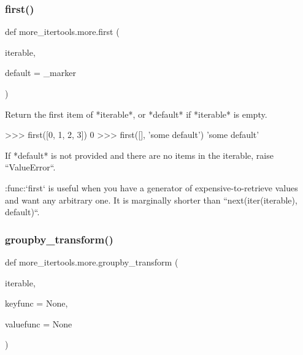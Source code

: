 \subsubsection{\texorpdfstring{first()}{first()}}
{\footnotesize\ttfamily def more\+\_\+itertools.\+more.\+first (\begin{DoxyParamCaption}\item[{}]{iterable,  }\item[{}]{default = {\ttfamily \+\_\+marker} }\end{DoxyParamCaption})}

\begin{DoxyVerb}Return the first item of *iterable*, or *default* if *iterable* is
empty.

    >>> first([0, 1, 2, 3])
    0
    >>> first([], 'some default')
    'some default'

If *default* is not provided and there are no items in the iterable,
raise ``ValueError``.

:func:`first` is useful when you have a generator of expensive-to-retrieve
values and want any arbitrary one. It is marginally shorter than
``next(iter(iterable), default)``.\end{DoxyVerb}
 \mbox{\label{namespacemore__itertools_1_1more_a78d2df36687e0e1116b8cdac592be650}} 
\subsubsection{\texorpdfstring{groupby\+\_\+transform()}{groupby\_transform()}}
{\footnotesize\ttfamily def more\+\_\+itertools.\+more.\+groupby\+\_\+transform (\begin{DoxyParamCaption}\item[{}]{iterable,  }\item[{}]{keyfunc = {\ttfamily None},  }\item[{}]{valuefunc = {\ttfamily None} }\end{DoxyParamCaption})}

